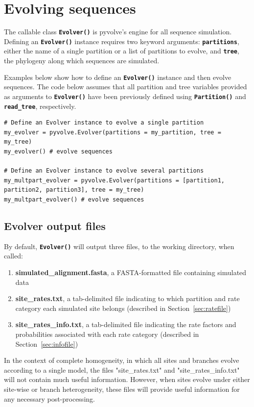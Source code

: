 \documentclass{article}
\newcommand{\code}[1]{\textbf{\texttt{\small{#1}}}}
\begin{document}
\section{Evolving sequences}\label{sec:evolver}

The callable class \code{Evolver()} is pyvolve's engine for all sequence simulation. Defining an \code{Evolver()} instance requires two keyword arguments: \code{partitions}, either the name of a single partition or a list of partitions to evolve, and \code{tree}, the phylogeny along which sequences are simulated.

Examples below show how to define an \code{Evolver()} instance and then evolve sequences. The code below assumes that all partition and tree variables provided as arguments to \code{Evolver()} have been previously defined using \code{Partition()} and \code{read\_tree}, respectively.
\begin{lstlisting}
# Define an Evolver instance to evolve a single partition
my_evolver = pyvolve.Evolver(partitions = my_partition, tree = my_tree)
my_evolver() # evolve sequences

# Define an Evolver instance to evolve several partitions
my_multpart_evolver = pyvolve.Evolver(partitions = [partition1, partition2, partition3], tree = my_tree)
my_multpart_evolver() # evolve sequences
\end{lstlisting}



\subsection{Evolver output files}\label{sec:output_files}

By default, \code{Evolver()} will output three files, to the working directory, when called:
\begin{enumerate}
	\item \textbf{simulated\_alignment.fasta}, a FASTA-formatted file containing simulated data
	\item \textbf{site\_rates.txt}, a tab-delimited file indicating to which partition and rate category each simulated site belongs (described in Section~\ref{sec:ratefile})
	\item \textbf{site\_rates\_info.txt}, a tab-delimited file indicating the rate factors and probabilities associated with each rate category (described in Section~\ref{sec:infofile})
\end{enumerate}


In the context of complete homogeneity, in which all sites and branches evolve according to a single model, the files "site\_rates.txt" and "site\_rates\_info.txt" will not contain much useful information. However, when sites evolve under either site-wise or branch heterogeneity, these files will provide useful information for any necessary post-processing.
\end{document}
